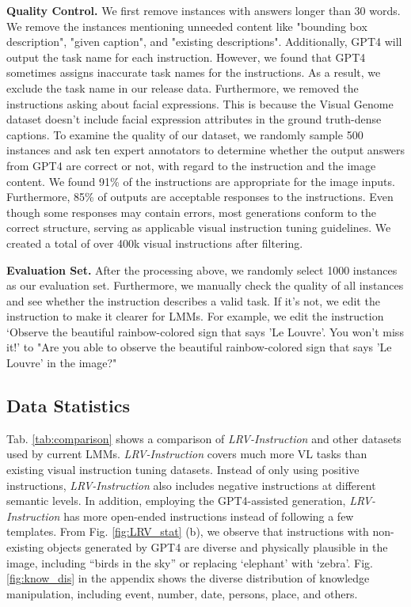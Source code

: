 \textbf{Quality Control. }We first remove instances with answers longer than 30 words. We remove the instances mentioning unneeded content like  "bounding box description", "given caption", and "existing descriptions". Additionally, GPT4 will output the task name for each instruction. However, we found that GPT4 sometimes assigns inaccurate task names for the instructions. As a result, we exclude the task name in our release data. Furthermore, we removed the instructions asking about facial expressions. This is because the Visual Genome dataset doesn’t include facial expression attributes in the ground truth-dense captions. To examine the quality of our dataset, we randomly sample 500 instances and ask ten expert annotators to determine whether the output answers from GPT4 are correct or not, with regard to the instruction and the image content. We found 91\% of the instructions are appropriate for the image inputs.
Furthermore, 85\% of outputs are acceptable responses to the instructions. Even though some responses may contain errors, most generations conform to the correct structure, serving as applicable visual instruction tuning guidelines. We created a total of over 400k visual instructions after filtering. 


\textbf{Evaluation Set. }After the processing above, we randomly select 1000 instances as our evaluation set. Furthermore, we manually check the quality of all instances and see whether the instruction describes a valid task. If it’s not, we edit the instruction to make it clearer for LMMs. For example,  we edit the instruction ‘Observe the beautiful rainbow-colored sign that says 'Le Louvre'. You won't miss it!’ to "Are you able to observe the beautiful rainbow-colored sign that says 'Le Louvre' in the image?"



\subsection{Data Statistics}
Tab. \ref{tab:comparison} shows a comparison of \textit{LRV-Instruction} and other datasets used by current LMMs. \textit{LRV-Instruction} covers much more VL tasks than existing visual instruction tuning datasets. Instead of only using positive instructions, \textit{LRV-Instruction} also includes negative instructions at different semantic levels. In addition, employing the GPT4-assisted generation, \textit{LRV-Instruction} has more open-ended instructions instead of following a few templates. From Fig. \ref{fig:LRV_stat} (b), we observe that instructions with non-existing objects generated by GPT4 are diverse and physically plausible in the image, including “birds in the sky” or replacing ‘elephant’ with ‘zebra’. Fig. \ref{fig:know_dis} in the appendix shows the diverse distribution of knowledge manipulation, including event, number, date, persons, place, and others.


